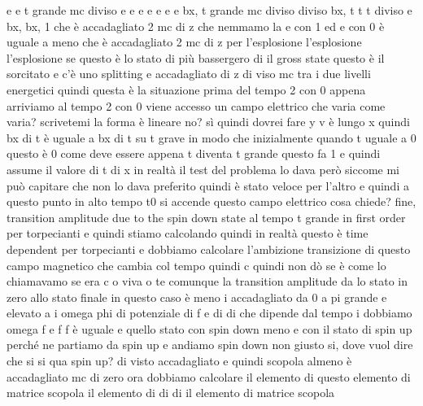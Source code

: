 \begin{soluzione}
   e e t grande mc diviso e e e e e e e bx, t grande mc diviso diviso bx, t t t diviso e bx, bx, 1 che è accadagliato 2 mc di z che nemmamo la e con 1 ed e con 0 è uguale a meno che è accadagliato 2 mc di z per l'esplosione l'esplosione l'esplosione se questo è lo stato di più bassergero di il gross state questo è il sorcitato e c'è uno splitting e accadagliato di z di viso mc tra i due livelli energetici quindi questa è la situazione prima del tempo 2 con 0 appena arriviamo al tempo 2 con 0 viene accesso un campo elettrico che varia come varia? scrivetemi la forma è lineare no? sì quindi dovrei fare y v è lungo x quindi bx di t è uguale a bx di t su t grave in modo che inizialmente quando t uguale a 0 questo è 0 come deve essere appena t diventa t grande questo fa 1 e quindi assume il valore di t di x in realtà il test del problema lo dava però siccome mi può capitare che non lo dava preferito quindi è stato veloce per l'altro e quindi a questo punto in alto tempo t0 si accende questo campo elettrico cosa chiede? fine, transition amplitude due to the spin down state al tempo t grande in first order per torpecianti e quindi stiamo calcolando quindi in realtà questo è time dependent per torpecianti e dobbiamo calcolare l'ambizione transizione di questo campo magnetico che cambia col tempo quindi c quindi non dò se è come lo chiamavamo se era c o viva o te comunque la transition amplitude da lo stato in zero allo stato finale in questo caso è meno i accadagliato da 0 a pi grande e elevato a i omega phi di potenziale di f e di di che dipende dal tempo i dobbiamo omega f e f f è uguale e quello stato con spin down meno e con il stato di spin up perché ne partiamo da spin up e andiamo spin down non giusto si, dove vuol dire che si si qua spin up? di visto accadagliato e quindi scopola almeno è accadagliato mc di zero ora dobbiamo calcolare il elemento di questo elemento di matrice scopola il elemento di di di il elemento di matrice scopola
   

\end{soluzione}
